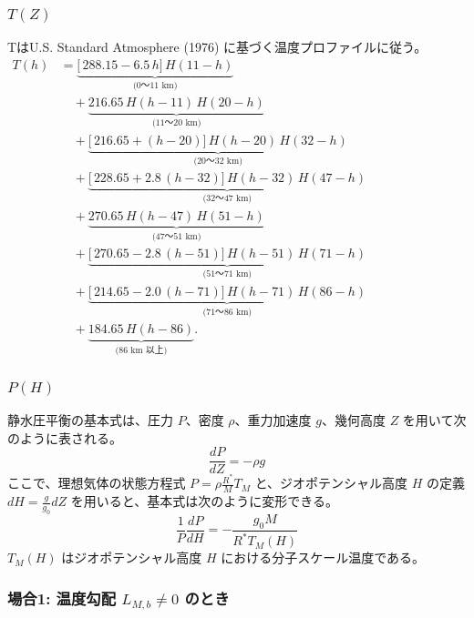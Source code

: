 \documentclass[a4paper,12pt]{article}
\begin{document}
\subsubsection{$T(Z)$}
TはU.S. Standard Atmosphere (1976) に基づく温度プロファイルに従う。\\
$\begin{aligned}
T(h)
&=
\underbrace{\bigl[\,288.15 - 6.5\,h\bigr]\,
H(11 - h)}_{\text{(0～11 km)}} \\[6pt]
&\quad{}+ 
\underbrace{216.65 \,
H(h - 11)\,H(20 - h)}_{\text{(11～20 km)}} \\[6pt]
&\quad{}+
\underbrace{\bigl[\,216.65 + (h - 20)\bigr]\,
H(h - 20)\,H(32 - h)}_{\text{(20～32 km)}} \\[6pt]
&\quad{}+
\underbrace{\bigl[\,228.65 + 2.8\,(h - 32)\bigr]\,
H(h - 32)\,H(47 - h)}_{\text{(32～47 km)}} \\[6pt]
&\quad{}+
\underbrace{270.65 \,
H(h - 47)\,H(51 - h)}_{\text{(47～51 km)}} \\[6pt]
&\quad{}+
\underbrace{\bigl[\,270.65 - 2.8\,(h - 51)\bigr]\,
H(h - 51)\,H(71 - h)}_{\text{(51～71 km)}} \\[6pt]
&\quad{}+
\underbrace{\bigl[\,214.65 - 2.0\,(h - 71)\bigr]\,
H(h - 71)\,H(86 - h)}_{\text{(71～86 km)}} \\[6pt]
&\quad{}+
\underbrace{184.65 \,
H(h - 86)}_{\text{(86 km 以上)}}.
\end{aligned}$


\subsubsection*{$P(H)$}

静水圧平衡の基本式は、圧力 $P$、密度 $\rho$、重力加速度 $g$、幾何高度 $Z$ を用いて次のように表される。
\[
\frac{dP}{dZ} = - \rho g
\]
ここで、理想気体の状態方程式 $P = \rho \frac{R^*}{M} T_M$ と、ジオポテンシャル高度 $H$ の定義 $dH = \frac{g}{g_0} dZ$ を用いると、基本式は次のように変形できる。
\[
\frac{1}{P}\frac{dP}{dH} = -\frac{g_0 M}{R^*T_M(H)}
\]
$T_M(H)$ はジオポテンシャル高度 $H$ における分子スケール温度である。

\subsubsection*{場合1: 温度勾配 $L_{M,b} \neq 0$ のとき}
\end{document}
